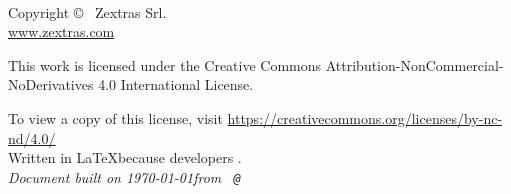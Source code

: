 
\newpage
~\vfill
\thispagestyle{empty}

Copyright \copyright\ \the\year{} Zextras Srl.\\ %

\url{www.zextras.com}\\ %

\ccbyncsa{}

This work is licensed under the Creative Commons Attribution-NonCommercial-NoDerivatives 4.0 International License.

To view a copy of this license, visit \url{https://creativecommons.org/licenses/by-nc-nd/4.0/}\\

Written in \LaTeX because developers \ExcuseToUseLatex.\\

\textit{Document built on \today from \texttt{\branchName\ @\href{https://github.com/ZeXtras/OpenChat/tree/\commitId}{\shortCommitId}}} %
